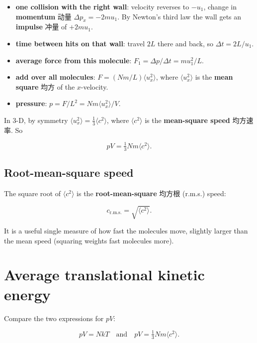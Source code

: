 \documentclass[11pt]{article}
\begin{document}
\begin{itemize}
\item \textbf{one collision with the right wall}: velocity reverses to $-u_{1}$, change in \textbf{momentum} 动量 $\Delta p_{x} = -2 m u_{1}$. By Newton's third law the wall gets an \textbf{impulse} 冲量 of $+2 m u_{1}$.

\item \textbf{time between hits on that wall}: travel $2L$ there and back, so $\Delta t = 2L/u_{1}$.

\item \textbf{average force from this molecule}: $F_{1} = \Delta p / \Delta t = m u_{1}^{2} / L$.

\item \textbf{add over all molecules}: $F = (Nm/L)\langle u_{x}^{2} \rangle$, where $\langle u_{x}^{2} \rangle$ is the \textbf{mean square} 均方 of the $x$-velocity.

\item \textbf{pressure}: $p = F/L^{2} = N m \langle u_{x}^{2} \rangle / V$.

\end{itemize}

In 3-D, by symmetry $\langle u_{x}^{2} \rangle = \tfrac{1}{3} \langle c^{2} \rangle$, where $\langle c^{2} \rangle$ is the \textbf{mean-square speed} 均方速率. So

\[
p V = \tfrac{1}{3} N m \langle c^{2} \rangle.
\]

\subsection*{Root-mean-square speed}

The square root of $\langle c^{2} \rangle$ is the \textbf{root-mean-square} 均方根 (r.m.s.) speed:

\[
c_{\text{r.m.s.}} = \sqrt{\langle c^{2} \rangle}.
\]

It is a useful single measure of how fast the molecules move, slightly larger than the mean speed (squaring weights fast molecules more).

\section*{Average translational kinetic energy}

Compare the two expressions for $pV$:

\[
p V = N k T \quad\text{and}\quad p V = \tfrac{1}{3} N m \langle c^{2} \rangle.
\]
\end{document}
